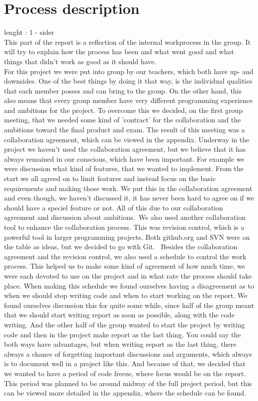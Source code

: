 \documentclass[a4paper,10pt,titlepage]{article}
\begin{document}
	\section{Process description}
		lenght : 1 - sider\\
		This part of the report is a reflection of the internal workprocess in the group. It will try to explain how the process has been and what went good and what things that didn't work as good as it should have. \\
		For this project we were put into group by our teachers, which both have up- and downsides. One of the best things by doing it that way, is the individual qualities that each member posses and can bring to the group. On the other hand, this also means that every group member have very different programming experience and ambitions for the project. To overcome this we decided, on the first group meeting, that we needed some kind of 'contract' for the collaboration and the ambitions toward the final product and exam. The result of this meeting was a collaboration agreement, which can be viewed in the appendix. Underway in the project we haven't used the collaboration agreement, but we believe that it has always remained in our conscious, which have been important. For example we were discussion what kind of features, that we wanted to implement. From the start we all agreed on to limit features and instead focus on the basic requirements and making those work. We put this in the collaboration agreement and even though, we haven't discussed it, it has never been hard to agree on if we should have a speciel feature or not. All of this due to our collaboration agreement and discussion about ambitions.\
		We also used another collaboration tool to enhance the collaboration process. This was revision control, which is a powerful tool in larger programming projects. Both github.org and SVN were on the table as ideas, but we decided to go with Git.  \
		Besides the collaboration agreement and the revision control, we also used a schedule to control the work process. This helped us to make some kind of agreement of how much time, we were each devoted to use on the project and in what rate the process should take place. When making this schedule we found ourselves having a disagreement as to when we should stop writing code and when to start working on the report. We found ourselves discussion this for quite some while, since half of the group meant that we should start writing report as soon as possible, along with the code writing. And the other half of the group wanted to start the project by writing code and then in the project make report as the last thing. You could say the both ways have advantages, but when writing report as the last thing, there always a chance of forgetting important discussions and arguments, which always is to document well in a project like this. And because of that, we decided that we wanted to have a period of code freeze, where focus would be on the report. This period was planned to be around midway of the full project period, but this can be viewed more detailed in the appendix, where the schedule can be found. \
		
\end{document}
